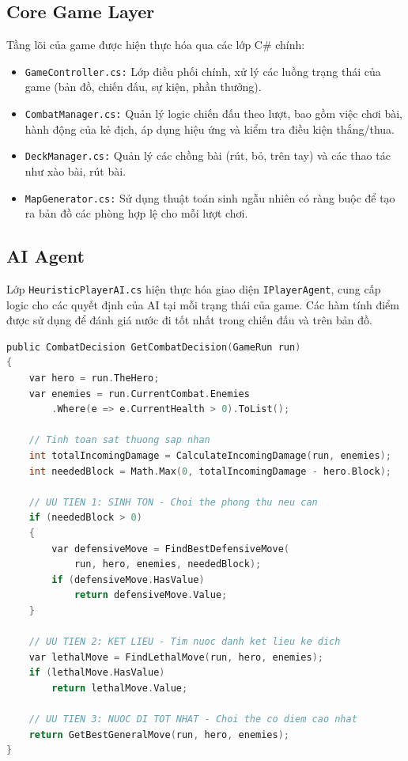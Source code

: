 \subsection{Core Game Layer}
Tầng lõi của game được hiện thực hóa qua các lớp C\# chính:
\begin{itemize}
    \item \texttt{GameController.cs:} Lớp điều phối chính, xử lý các luồng trạng thái của game (bản đồ, chiến đấu, sự kiện, phần thưởng).
    \item \texttt{CombatManager.cs:} Quản lý logic chiến đấu theo lượt, bao gồm việc chơi bài, hành động của kẻ địch, áp dụng hiệu ứng và kiểm tra điều kiện thắng/thua.
    \item \texttt{DeckManager.cs:} Quản lý các chồng bài (rút, bỏ, trên tay) và các thao tác như xào bài, rút bài.
    \item \texttt{MapGenerator.cs:} Sử dụng thuật toán sinh ngẫu nhiên có ràng buộc để tạo ra bản đồ các phòng hợp lệ cho mỗi lượt chơi.
\end{itemize}

\subsection{AI Agent}
Lớp \texttt{HeuristicPlayerAI.cs} hiện thực hóa giao diện \texttt{IPlayerAgent}, cung cấp logic cho các quyết định của AI tại mỗi trạng thái của game. Các hàm tính điểm được sử dụng để đánh giá nước đi tốt nhất trong chiến đấu và trên bản đồ.

\begin{lstlisting}[language=C, caption={Logic ra quyết định trong chiến đấu của AI agent}, label={lst:ai_combat_decision}]
public CombatDecision GetCombatDecision(GameRun run)
{
    var hero = run.TheHero;
    var enemies = run.CurrentCombat.Enemies
        .Where(e => e.CurrentHealth > 0).ToList();
    
    // Tinh toan sat thuong sap nhan
    int totalIncomingDamage = CalculateIncomingDamage(run, enemies);
    int neededBlock = Math.Max(0, totalIncomingDamage - hero.Block);

    // UU TIEN 1: SINH TON - Choi the phong thu neu can
    if (neededBlock > 0)
    {
        var defensiveMove = FindBestDefensiveMove(
            run, hero, enemies, neededBlock);
        if (defensiveMove.HasValue)
            return defensiveMove.Value;
    }

    // UU TIEN 2: KET LIEU - Tim nuoc danh ket lieu ke dich
    var lethalMove = FindLethalMove(run, hero, enemies);
    if (lethalMove.HasValue)
        return lethalMove.Value;

    // UU TIEN 3: NUOC DI TOT NHAT - Choi the co diem cao nhat
    return GetBestGeneralMove(run, hero, enemies);
}
\end{lstlisting}

